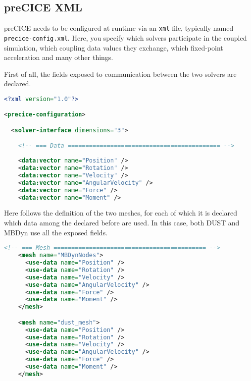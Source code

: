\subsection{preCICE XML}
preCICE needs to be configured at runtime via an \texttt{xml} file, typically named \texttt{precice-config.xml}. Here, you specify which solvers participate in the coupled simulation, which coupling data values they exchange, which fixed-point acceleration and many other things.

First of all, the fields exposed to communication between the two solvers are declared.
\begin{lstlisting}[language=XML]
<?xml version="1.0"?>

<precice-configuration>

  <solver-interface dimensions="3">

    <!-- === Data =========================================== -->
    
    <data:vector name="Position" />
    <data:vector name="Rotation" />
    <data:vector name="Velocity" />
    <data:vector name="AngularVelocity" />
    <data:vector name="Force" />
    <data:vector name="Moment" />
\end{lstlisting}  

Here follows the definition of the two meshes, for each of which it is declared which data among the declared before are used.
In this case, both DUST and MBDyn use all the exposed fields.
\begin{lstlisting}[language=XML]
    <!-- === Mesh =========================================== -->
    <mesh name="MBDynNodes">
      <use-data name="Position" />
      <use-data name="Rotation" />
      <use-data name="Velocity" />
      <use-data name="AngularVelocity" />
      <use-data name="Force" />
      <use-data name="Moment" />
    </mesh>

    <mesh name="dust_mesh">
      <use-data name="Position" />
      <use-data name="Rotation" />
      <use-data name="Velocity" />
      <use-data name="AngularVelocity" />
      <use-data name="Force" />
      <use-data name="Moment" />
    </mesh>
\end{lstlisting} 

